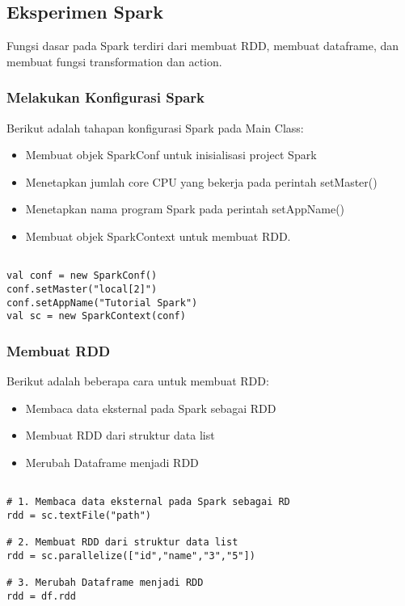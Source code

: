 \subsection{Eksperimen Spark}
Fungsi dasar pada Spark terdiri dari membuat RDD, membuat dataframe, dan membuat fungsi transformation dan action. 

\subsubsection{Melakukan Konfigurasi Spark}
Berikut adalah tahapan konfigurasi Spark pada Main Class:
\begin{itemize}
\item Membuat objek SparkConf untuk inisialisasi project Spark
\item Menetapkan jumlah core CPU yang bekerja pada perintah setMaster()
\item Menetapkan nama program Spark pada perintah setAppName()
\item Membuat objek SparkContext untuk membuat RDD.

\end{itemize}

\begin{lstlisting}[basicstyle=\ttfamily, frame=single,
	columns=fullflexible, keepspaces=true, breaklines=true, label=ls_kepatuhan_1_1_1_logo_sharif_judge, caption=Konfigurasi Spark]
	
val conf = new SparkConf()
conf.setMaster("local[2]")
conf.setAppName("Tutorial Spark")
val sc = new SparkContext(conf)

\end{lstlisting}
  
\newpage
\subsubsection{Membuat RDD}
\noindent Berikut adalah beberapa cara untuk membuat RDD:
\begin{itemize}
\item Membaca data eksternal pada Spark sebagai RDD
\item Membuat RDD dari struktur data list
\item Merubah Dataframe menjadi RDD
\end{itemize}

\begin{lstlisting}[basicstyle=\ttfamily, frame=single,
	columns=fullflexible, keepspaces=true, breaklines=true, label=ls_kepatuhan_1_1_1_logo_sharif_judge, caption=Cara Pembuatan RDD]
	
# 1. Membaca data eksternal pada Spark sebagai RD
rdd = sc.textFile("path")

# 2. Membuat RDD dari struktur data list
rdd = sc.parallelize(["id","name","3","5"])

# 3. Merubah Dataframe menjadi RDD
rdd = df.rdd

\end{lstlisting}

